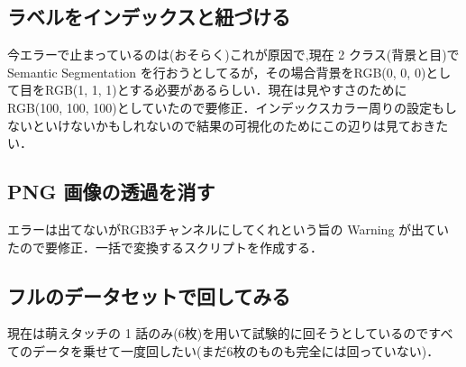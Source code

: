 \documentclass[onecolumn]{ujarticle}   %
\begin{document}
	\subsection{ラベルをインデックスと紐づける}
	今エラーで止まっているのは(おそらく)これが原因で,現在 2 クラス(背景と目)で Semantic Segmentation を行おうとしてるが，その場合背景をRGB(0, 0, 0)として目をRGB(1, 1, 1)とする必要があるらしい．現在は見やすさのためにRGB(100, 100, 100)としていたので要修正．インデックスカラー周りの設定もしないといけないかもしれないので結果の可視化のためにこの辺りは見ておきたい．
	
	\subsection{PNG 画像の透過を消す}
	エラーは出てないがRGB3チャンネルにしてくれという旨の Warning が出ていたので要修正．一括で変換するスクリプトを作成する．
	
	\subsection{フルのデータセットで回してみる}
	現在は萌えタッチの 1 話のみ(6枚)を用いて試験的に回そうとしているのですべてのデータを乗せて一度回したい(まだ6枚のものも完全には回っていない)．
	
\end{document}
